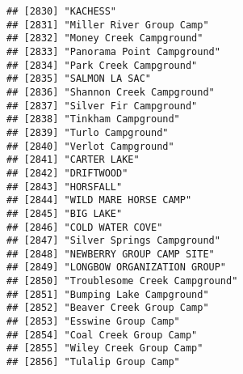 \documentclass[
]{article}
\begin{document}
\begin{verbatim}
## [2830] "KACHESS"                                                                             
## [2831] "Miller River Group Camp"                                                             
## [2832] "Money Creek Campground"                                                              
## [2833] "Panorama Point Campground"                                                           
## [2834] "Park Creek Campground"                                                               
## [2835] "SALMON LA SAC"                                                                       
## [2836] "Shannon Creek Campground"                                                            
## [2837] "Silver Fir Campground"                                                               
## [2838] "Tinkham Campground"                                                                  
## [2839] "Turlo Campground"                                                                    
## [2840] "Verlot Campground"                                                                   
## [2841] "CARTER LAKE"                                                                         
## [2842] "DRIFTWOOD"                                                                           
## [2843] "HORSFALL"                                                                            
## [2844] "WILD MARE HORSE CAMP"                                                                
## [2845] "BIG LAKE"                                                                            
## [2846] "COLD WATER COVE"                                                                     
## [2847] "Silver Springs Campground"                                                           
## [2848] "NEWBERRY GROUP CAMP SITE"                                                            
## [2849] "LONGBOW ORGANIZATION GROUP"                                                          
## [2850] "Troublesome Creek Campground"                                                        
## [2851] "Bumping Lake Campground"                                                             
## [2852] "Beaver Creek Group Camp"                                                             
## [2853] "Esswine Group Camp"                                                                  
## [2854] "Coal Creek Group Camp"                                                               
## [2855] "Wiley Creek Group Camp"                                                              
## [2856] "Tulalip Group Camp"                                                                  

\end{verbatim}
\end{document}
